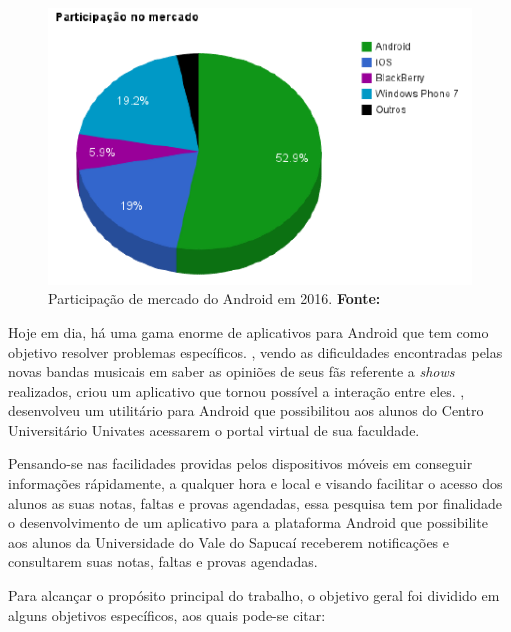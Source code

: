	\begin{figure}[h!]
		\centerline{\includegraphics[scale=1]{./imagens/0_introducao/introducao.png}}
		\caption[Participação de mercado do Android em 2016]{Participação de
		mercado do Android em 2016.
		\textbf{Fonte:}}
		\label{fig:intro}
	\end{figure}

	\par Hoje em dia, há uma gama enorme de aplicativos para Android que
tem como objetivo resolver problemas específicos. ,
vendo as dificuldades encontradas pelas novas bandas musicais em saber as
opiniões de seus fãs referente a \textit{shows} realizados, criou um aplicativo
que tornou possível a interação entre eles. , desenvolveu
um utilitário para Android que possibilitou aos alunos do Centro
Universitário Univates acessarem o portal virtual de sua faculdade.


	\par Pensando-se nas facilidades providas pelos dispositivos móveis em
conseguir informações rápidamente, a qualquer hora e local e visando facilitar
o acesso dos alunos as suas notas, faltas e provas agendadas, essa pesquisa tem
por finalidade o desenvolvimento de um aplicativo para a plataforma Android que
possibilite aos alunos da Universidade do Vale do Sapucaí receberem
notificações e consultarem suas notas, faltas e provas agendadas.

	
	\par Para alcançar o propósito principal do trabalho, o objetivo geral foi
dividido em alguns objetivos específicos, aos quais pode-se citar:
	
